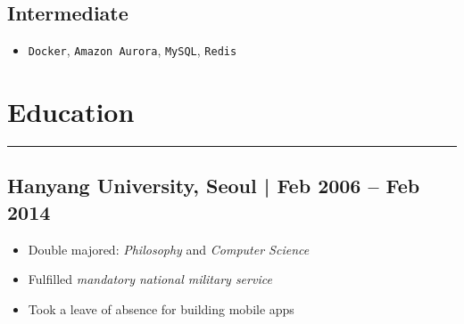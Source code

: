 \documentclass[11pt]{article}
\begin{document}
\subsection*{Intermediate}
\label{sec:orgfc895dd}
\begin{itemize}[label=$\circ$,itemsep=-0.5ex]
\item \texttt{Docker}, \texttt{Amazon Aurora}, \texttt{MySQL}, \texttt{Redis}
\end{itemize}

\section*{Education}
\label{sec:org5a15544}
\vspace{-4ex}

\noindent\rule{\textwidth}{0.5pt}
\vspace{-4ex}

\subsection*{Hanyang University, Seoul | Feb 2006 – Feb 2014}
\label{sec:org74f3302}
\begin{itemize}[label=$\circ$,itemsep=-0.5ex]
\item Double majored: \emph{Philosophy} and \emph{Computer Science}
\item Fulfilled \emph{mandatory national military service}
\item Took a leave of absence for building mobile apps
\end{itemize}
\end{document}
